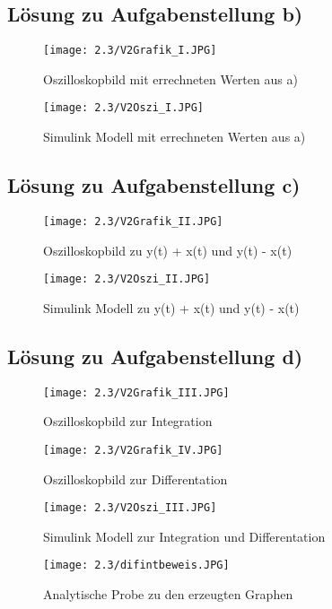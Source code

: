 \documentclass[12pt,a4paper]{scrartcl}	%
\begin{document}
\subsection{Lösung zu  Aufgabenstellung b)\grqq}
\begin{figure}[ht]
	\centering
	\texttt{[image: 2.3/V2Grafik\_I.JPG]}
	\caption{Oszilloskopbild mit errechneten Werten aus a)} 
\end{figure}
\begin{figure}[bht]
	\centering
	\texttt{[image: 2.3/V2Oszi\_I.JPG]}
	\caption{Simulink Modell mit errechneten Werten aus a)} 
\end{figure}
\clearpage
\subsection{Lösung zu  Aufgabenstellung c)\grqq}
\begin{figure}[thb]
	\centering
	\texttt{[image: 2.3/V2Grafik\_II.JPG]}
	\caption{Oszilloskopbild zu y(t) + x(t) und y(t) - x(t)} 
\end{figure}
\begin{figure}[bh]
	\centering
	\texttt{[image: 2.3/V2Oszi\_II.JPG]}
	\caption{Simulink Modell zu y(t) + x(t) und y(t) - x(t)} 
	\end{figure}
\clearpage
\subsection{Lösung zu  Aufgabenstellung d)\grqq}
\begin{figure}[thb]
	\centering
	\texttt{[image: 2.3/V2Grafik\_III.JPG]}
	\caption{Oszilloskopbild zur Integration } 
\end{figure}
\begin{figure}[bh]
	\centering
	\texttt{[image: 2.3/V2Grafik\_IV.JPG]}
	\caption{Oszilloskopbild zur Differentation } 
	\end{figure}
\clearpage
\begin{figure}[thb]
	\centering
	\texttt{[image: 2.3/V2Oszi\_III.JPG]}
	\caption{Simulink Modell zur Integration und Differentation} 
\end{figure}
\clearpage
\begin{figure}
	\centering
	\texttt{[image: 2.3/difintbeweis.JPG]}
	\caption{Analytische Probe zu den erzeugten Graphen} 
\end{figure}
\clearpage
\end{document}
